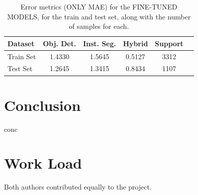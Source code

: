 \documentclass[conference]{IEEEtran}
\begin{document}
\begin{table}[H]
\centering
\caption{Error metrics (ONLY MAE) for the FINE-TUNED MODELS, for the train and test set, along with the number of samples for each.}
\label{tab:model02_results}
\begin{tabular}{lccccc}
\toprule
\textbf{Dataset} & \textbf{Obj. Det.} & \textbf{Inst. Seg.} & \textbf{Hybrid} & \textbf{Support} \\
\midrule
Train Set & 1.4330 & 1.5645 & 0.5127 & 3312 \\
Test Set & 1.2645 & 1.3415 & 0.8434 & 1107 \\
\bottomrule
\end{tabular}
\end{table}


\section{Conclusion}

conc


\section*{Work Load}

Both authors contributed equally to the project.



\end{document}

